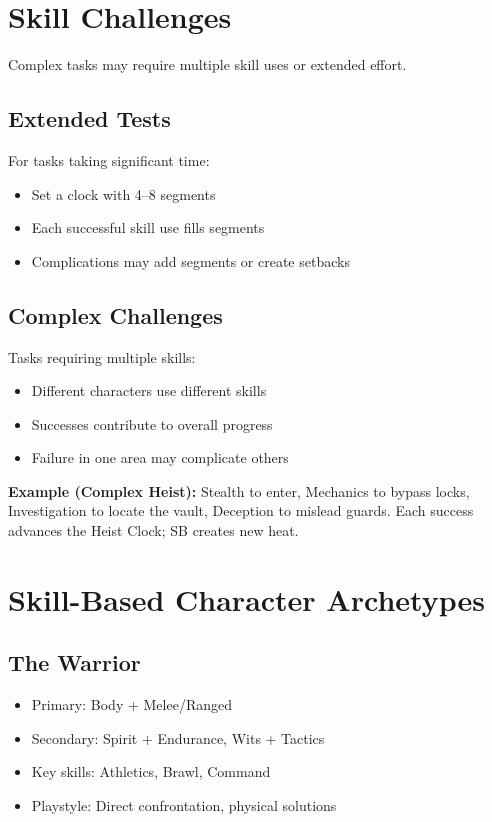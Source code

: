 \documentclass[11pt,twoside,openany]{book}
\begin{document}
\section*{Skill Challenges} 

Complex tasks may require multiple skill uses or extended effort.

\subsection*{Extended Tests}

For tasks taking significant time:
\begin{itemize}
\item Set a clock with 4–8 segments
\item Each successful skill use fills segments
\item Complications may add segments or create setbacks
\end{itemize}

\subsection*{Complex Challenges}

Tasks requiring multiple skills:
\begin{itemize}
\item Different characters use different skills
\item Successes contribute to overall progress
\item Failure in one area may complicate others
\end{itemize}

\textbf{Example (Complex Heist):} Stealth to enter, Mechanics to bypass locks, Investigation to locate the vault, Deception to mislead guards. Each success advances the Heist Clock; SB creates new heat.

\section*{Skill-Based Character Archetypes} 

\subsection*{The Warrior}

\begin{itemize}
\item Primary: Body + Melee/Ranged
\item Secondary: Spirit + Endurance, Wits + Tactics
\item Key skills: Athletics, Brawl, Command
\item Playstyle: Direct confrontation, physical solutions
\end{itemize}
\end{document}
